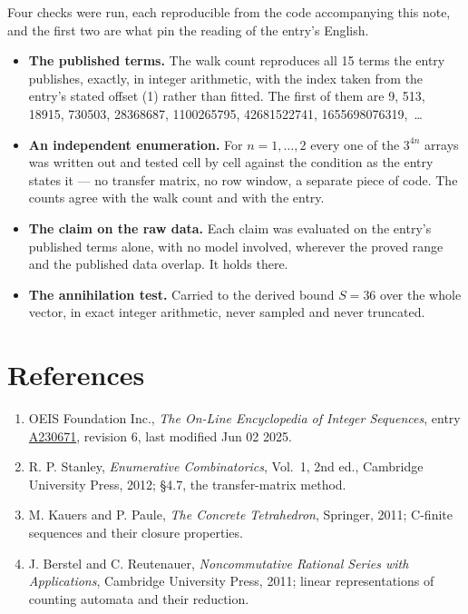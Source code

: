 \documentclass[11pt]{article}
\theoremstyle{definition}
\begin{document}
Four checks were run, each reproducible from the code accompanying this note, and the first two are what pin the reading of the entry's English.

\begin{itemize}

\item {\bfseries The published terms.} The walk count reproduces all 15 terms the entry publishes, exactly, in integer arithmetic, with the index taken from the entry's stated offset (1) rather than fitted. The first of them are 9, 513, 18915, 730503, 28368687, 1100265795, 42681522741, 1655698076319,~\dots

\item {\bfseries An independent enumeration.} For $n = 1,\dots,2$ every one of the $3^{4n}$ arrays was written out and tested cell by cell against the condition as the entry states it --- no transfer matrix, no row window, a separate piece of code. The counts agree with the walk count and with the entry.

\item {\bfseries The claim on the raw data.} Each claim was evaluated on the entry's published terms alone, with no model involved, wherever the proved range and the published data overlap. It holds there.

\item {\bfseries The annihilation test.} Carried to the derived bound $S = 36$ over the whole vector, in exact integer arithmetic, never sampled and never truncated.

\end{itemize}

\section{References}

\begin{enumerate}

\item OEIS Foundation Inc., \emph{The On-Line Encyclopedia of Integer Sequences}, entry \href{https://oeis.org/A230671}{A230671}, revision 6, last modified Jun 02 2025.

\item R. P. Stanley, \emph{Enumerative Combinatorics}, Vol.~1, 2nd ed., Cambridge University Press, 2012; \S4.7, the transfer-matrix method.

\item M. Kauers and P. Paule, \emph{The Concrete Tetrahedron}, Springer, 2011; C-finite sequences and their closure properties.

\item J. Berstel and C. Reutenauer, \emph{Noncommutative Rational Series with Applications}, Cambridge University Press, 2011; linear representations of counting automata and their reduction.

\end{enumerate}
\end{document}

